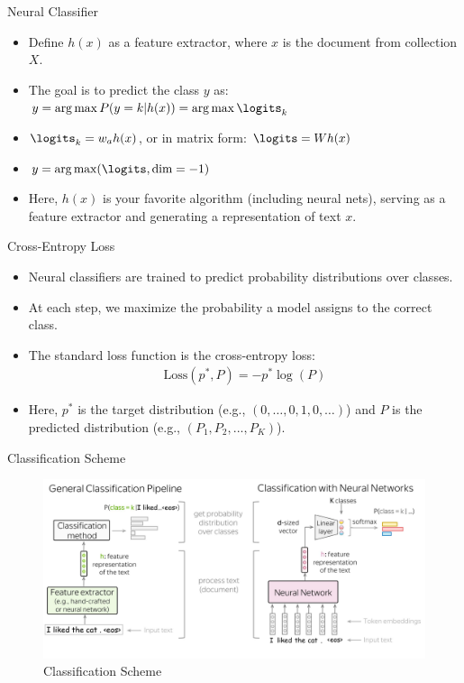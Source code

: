 \documentclass{beamer}
\begin{document}
\begin{frame}{Neural Classifier}
    \begin{itemize}
        \item Define $h(x)$ as a feature extractor, where $x$ is the document from collection $X$.
        \item The goal is to predict the class $y$ as: \\
        $y = \arg\max P(y = k | h(x)) = \arg\max \logits_k$
        \item $\logits_k = w_a h(x)$, or in matrix form: $\logits = W h(x)$
        \item $y = \arg\max(\logits, \dim=-1)$
        \item Here, $h(x)$ is your favorite algorithm (including neural nets), serving as a feature extractor and generating a representation of text $x$.
    \end{itemize}
\end{frame}

\begin{frame}{Cross-Entropy Loss}
    \begin{itemize}
        \item Neural classifiers are trained to predict probability distributions over classes.
        \item At each step, we maximize the probability a model assigns to the correct class.
        \item The standard loss function is the cross-entropy loss:
        \begin{align*}
        \text{Loss}(p^*, P) = - p^* \log(P)
        \end{align*}
        \item Here, $p^*$ is the target distribution (e.g., $(0,\dots, 0, 1, 0, \dots)$) and $P$ is the predicted distribution (e.g., $(P_1, P_2, ..., P_K)$).
    \end{itemize}
\end{frame}

\begin{frame}{Classification Scheme}
    \begin{figure}
        \centering
        \includegraphics[width=1\textwidth,keepaspectratio]{images/classification_pipeline}
        \caption{Classification Scheme}
        \label{fig:classification_pipeline}
    \end{figure}
    
\end{frame}
\end{document}
